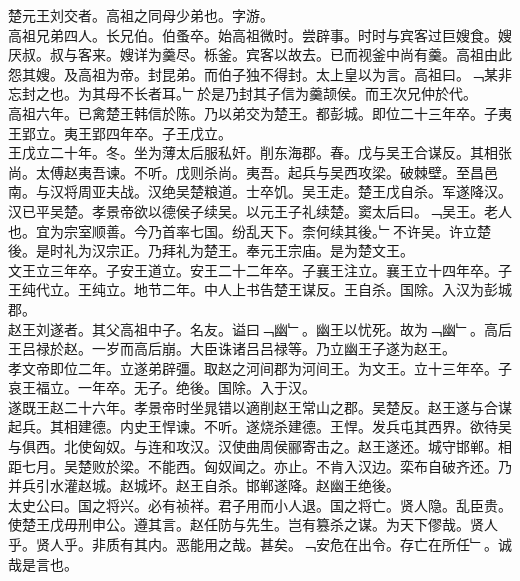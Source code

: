 \documentclass{zhvt-classic}
\begin{document}
\hspace*{2em}楚元王刘交者。高祖之同母少弟也。字游。\\
\hspace*{2em}高祖兄弟四人。长兄伯。伯蚤卒。始高祖微时。尝辟事。时时与宾客过巨嫂食。嫂厌叔。叔与客来。嫂详为羹尽。栎釜。宾客以故去。已而视釜中尚有羹。高祖由此怨其嫂。及高祖为帝。封昆弟。而伯子独不得封。太上皇以为言。高祖曰。﹁某非忘封之也。为其母不长者耳。﹂於是乃封其子信为羹颉侯。而王次兄仲於代。\\
\hspace*{2em}高祖六年。已禽楚王韩信於陈。乃以弟交为楚王。都彭城。即位二十三年卒。子夷王郢立。夷王郢四年卒。子王戊立。\\
\hspace*{2em}王戊立二十年。冬。坐为薄太后服私奸。削东海郡。春。戊与吴王合谋反。其相张尚。太傅赵夷吾谏。不听。戊则杀尚。夷吾。起兵与吴西攻梁。破棘壁。至昌邑南。与汉将周亚夫战。汉绝吴楚粮道。士卒饥。吴王走。楚王戊自杀。军遂降汉。\\
\hspace*{2em}汉已平吴楚。孝景帝欲以德侯子续吴。以元王子礼续楚。窦太后曰。﹁吴王。老人也。宜为宗室顺善。今乃首率七国。纷乱天下。柰何续其後。﹂不许吴。许立楚後。是时礼为汉宗正。乃拜礼为楚王。奉元王宗庙。是为楚文王。\\
\hspace*{2em}文王立三年卒。子安王道立。安王二十二年卒。子襄王注立。襄王立十四年卒。子王纯代立。王纯立。地节二年。中人上书告楚王谋反。王自杀。国除。入汉为彭城郡。\\
\hspace*{2em}赵王刘遂者。其父高祖中子。名友。谥曰﹁幽﹂。幽王以忧死。故为﹁幽﹂。高后王吕禄於赵。一岁而高后崩。大臣诛诸吕吕禄等。乃立幽王子遂为赵王。\\
\hspace*{2em}孝文帝即位二年。立遂弟辟彊。取赵之河间郡为河间王。为文王。立十三年卒。子哀王福立。一年卒。无子。绝後。国除。入于汉。\\
\hspace*{2em}遂既王赵二十六年。孝景帝时坐晁错以適削赵王常山之郡。吴楚反。赵王遂与合谋起兵。其相建德。内史王悍谏。不听。遂烧杀建德。王悍。发兵屯其西界。欲待吴与俱西。北使匈奴。与连和攻汉。汉使曲周侯郦寄击之。赵王遂还。城守邯郸。相距七月。吴楚败於梁。不能西。匈奴闻之。亦止。不肯入汉边。栾布自破齐还。乃并兵引水灌赵城。赵城坏。赵王自杀。邯郸遂降。赵幽王绝後。\\
\hspace*{2em}太史公曰。国之将兴。必有祯祥。君子用而小人退。国之将亡。贤人隐。乱臣贵。使楚王戊毋刑申公。遵其言。赵任防与先生。岂有篡杀之谋。为天下僇哉。贤人乎。贤人乎。非质有其内。恶能用之哉。甚矣。﹁安危在出令。存亡在所任﹂。诚哉是言也。\\
\end{document}
